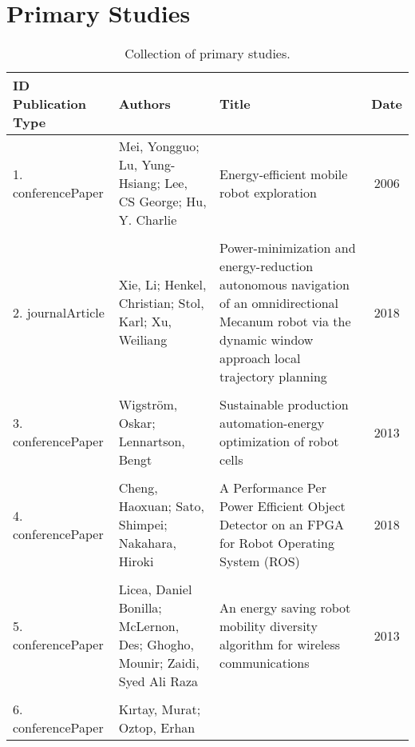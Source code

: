 \section{Primary Studies}
\label{appendix:primary_studies}

\begin{table}[h]
    \centering
    \caption{Collection of primary studies.}
    \begin{tabular}{lp{5cm}p{9cm}c}
        \toprule
            {ID}
                {Publication Type} & 
                {Authors} & 
                {Title} &
                {Date} \\
        \midrule
            {1.}
                {conferencePaper} &
                {Mei, Yongguo; Lu, Yung-Hsiang; Lee, CS George; Hu, Y. Charlie} &
                {Energy-efficient mobile robot exploration} &
                {2006} \\
            \hline
            \\
            {2.}
                {journalArticle} &
                {Xie, Li; Henkel, Christian; Stol, Karl; Xu, Weiliang} &
                {Power-minimization and energy-reduction autonomous navigation of an omnidirectional Mecanum robot via the dynamic window approach local trajectory planning} &
                {2018} \\
            \hline
            \\
            {3.}
                {conferencePaper} &
                {Wigström, Oskar; Lennartson, Bengt} &
                {Sustainable production automation-energy optimization of robot cells} &
                {2013} \\
            \hline
            \\
            {4.}
                {conferencePaper} &
                {Cheng, Haoxuan; Sato, Shimpei; Nakahara, Hiroki} &
                {A Performance Per Power Efficient Object Detector on an FPGA for Robot Operating System (ROS)} &
                {2018} \\
            \hline
            \\
            {5.}
                {conferencePaper} &
                {Licea, Daniel Bonilla; McLernon, Des; Ghogho, Mounir; Zaidi, Syed Ali Raza} &
                {An energy saving robot mobility diversity algorithm for wireless communications} &
                {2013} \\
            \hline
            \\
            {6.}
                {conferencePaper} &
                {Kırtay, Murat; Oztop, Erhan} &

\end{tabular}
\end{table}
